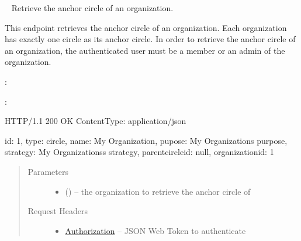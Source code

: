 \documentclass[letterpaper,10pt,english]{sphinxmanual}
\begin{document}
\begin{fulllineitems}
\label{\detokenize{resources/organization:get--organizations-(organization_id)-anchor_circle}}~
Retrieve the anchor circle of an organization.

This endpoint retrieves the anchor circle of an organization. Each
organization has exactly one circle as its anchor circle. In order to
retrieve the anchor circle of an organization, the authenticated user
must be a member or an admin of the organization.

:

\begin{sphinxVerbatim}[commandchars=\\\{\}]
  
 
 
\end{sphinxVerbatim}

:

\begin{sphinxVerbatim}[commandchars=\\\{\}]
HTTP/1.1 200 OK
Content\PYGZhy{}Type: application/json

\PYGZob{}
    \PYGZsq{}id\PYGZsq{}: 1,
    \PYGZsq{}type\PYGZsq{}: \PYGZsq{}circle\PYGZsq{},
    \PYGZsq{}name\PYGZsq{}: \PYGZsq{}My Organization\PYGZsq{},
    \PYGZsq{}pupose\PYGZsq{}: \PYGZsq{}My Organization\PYGZsq{}s purpose\PYGZsq{},
    \PYGZsq{}strategy\PYGZsq{}: \PYGZsq{}My Organizations\PYGZsq{}s strategy\PYGZsq{},
    \PYGZsq{}parent\PYGZus{}circle\PYGZus{}id\PYGZsq{}: null,
    \PYGZsq{}organization\PYGZus{}id\PYGZsq{}: 1
\PYGZcb{}
\end{sphinxVerbatim}
\begin{quote}\begin{description}
\item[{Parameters}] \leavevmode\begin{itemize}
\item {} 
 () -- the organization to retrieve the anchor
circle of

\end{itemize}

\item[{Request Headers}] \leavevmode\begin{itemize}
\item {} 
\href{http://tools.ietf.org/html/rfc7235\#section-4.2}{Authorization} -- JSON Web Token to authenticate


\end{itemize}
\end{description}
\end{quote}
\end{fulllineitems}
\end{document}
